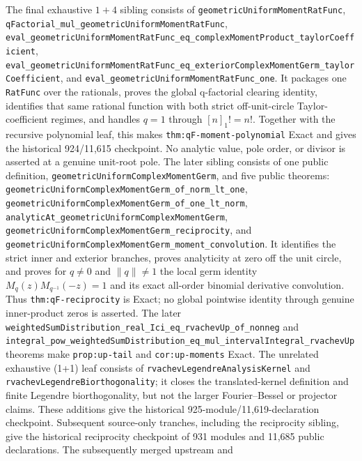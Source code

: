 \documentclass[11pt]{article}
\theoremstyle{remark}
\begin{document}
The final exhaustive \(1+4\)
 sibling consists of
\nolinkurl{geometricUniformMomentRatFunc},
\nolinkurl{qFactorial_mul_geometricUniformMomentRatFunc},
\nolinkurl{eval_geometricUniformMomentRatFunc_eq_complexMomentProduct_taylorCoefficient},
\nolinkurl{eval_geometricUniformMomentRatFunc_eq_exteriorComplexMomentGerm_taylorCoefficient},
and \nolinkurl{eval_geometricUniformMomentRatFunc_one}.  It packages one
\texttt{RatFunc} over the rationals, proves the global q-factorial clearing
identity, identifies that same rational function with both strict
off-unit-circle Taylor-coefficient regimes, and handles \(q=1\) through
\([n]_1!=n!\).  Together with the recursive polynomial leaf, this makes
\nolinkurl{thm:qF-moment-polynomial} Exact and gives the historical
924/11,615 checkpoint.  No analytic value, pole order, or divisor is asserted
at a genuine unit-root pole.  The later
 sibling consists of one public
definition, \nolinkurl{geometricUniformComplexMomentGerm}, and five public
theorems:
\nolinkurl{geometricUniformComplexMomentGerm_of_norm_lt_one},
\nolinkurl{geometricUniformComplexMomentGerm_of_one_lt_norm},
\nolinkurl{analyticAt_geometricUniformComplexMomentGerm},
\nolinkurl{geometricUniformComplexMomentGerm_reciprocity}, and
\nolinkurl{geometricUniformComplexMomentGerm_moment_convolution}.  It identifies
the strict inner and exterior branches, proves analyticity at zero off the unit
circle, and proves for \(q\ne0\) and \(\lVert q\rVert\ne1\) the local germ
identity \(M_q(z)M_{q^{-1}}(-z)=1\) and its exact all-order binomial derivative
convolution.  Thus \nolinkurl{thm:qF-reciprocity} is Exact; no global pointwise
identity through genuine inner-product zeros is asserted.  The later
\nolinkurl{weightedSumDistribution_real_Ici_eq_rvachevUp_of_nonneg} and
\nolinkurl{integral_pow_weightedSumDistribution_eq_mul_intervalIntegral_rvachevUp}
theorems make \nolinkurl{prop:up-tail} and \nolinkurl{cor:up-moments} Exact.
The unrelated exhaustive (1+1)
 leaf consists of
\nolinkurl{rvachevLegendreAnalysisKernel} and
\nolinkurl{rvachevLegendreBiorthogonality}; it closes the translated-kernel
definition and finite Legendre biorthogonality, but not the larger
Fourier--Bessel or projector claims.  These additions give the historical
925-module/11,619-declaration checkpoint.  Subsequent source-only
tranches, including the reciprocity sibling, give the historical reciprocity
checkpoint of 931 modules and 11,685 public declarations.  The subsequently
merged upstream  and
\end{document}
